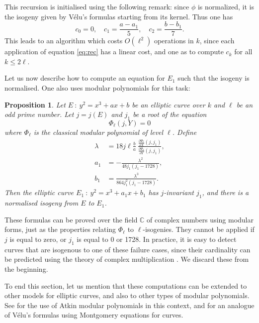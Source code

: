\documentclass{article}
\newcommand{\C}{\mathbb{C}}
\renewcommand{\v}{\vspace{5mm}}
\newtheorem{prop}[theorem]{Proposition}
\theoremstyle{definition}
\begin{document}
This recursion is initialised using the following remark: since $\phi$
is normalized,
it is the isogeny given by Vélu's formulas starting from its kernel. Thus
one has
\[
c_0 = 0,\quad c_1 = \frac{a - a_1}{5},\quad c_2 = \frac{b - b_1}{7}.
\]
This leads to an algorithm which costs $O(\ell^2)$ operations in $k$, since each
application of equation \ref{eq:rec} has a linear cost, and one as to compute
$c_k$ for all $k\leq 2\ell$.

Let us now describe how to compute an equation for $E_1$ such that the isogeny
is normalised. One also uses modular polynomials for this task:

\begin{prop}
Let $E\ :\ y^2 = x^3 + ax + b$ be an elliptic curve over $k$
 and $\ell$ be an odd prime number. Let $j = j(E)$ and $j_1$
be a root of the equation
\[
\Phi_\ell(j, Y) = 0
\]
where $\Phi_\ell$ is the classical modular polynomial of level $\ell$.
Define
\begin{equation}
\label{eq:norm}
\begin{aligned}
\lambda &= 18 j \ell \frac{b}{a}\ 
	\frac{\frac{\partial \Phi_\ell}{\partial X}(j, j_1)}
			 {\frac{\partial \Phi_\ell}{\partial Y}(j, j_1)},\\
a_1 &= -\frac{\lambda^2}{48 j_1(j_1 - 1728)},\\
b_1 &= \frac{\lambda^3}{864 j_1^2(j_1 - 1728)}.
\end{aligned}
\end{equation}
Then the elliptic curve $E_1\ :\ y^2 = x^3 + a_1x + b_1$ has $j$-invariant $j_1$,
and there is a normalised isogeny from $E$ to $E_1$.
\end{prop}

These formulas can be proved over the field $\C$ of complex numbers using
modular forms, just as the properties relating $\Phi_\ell$ to $\ell$-isogenies.
They cannot be applied if $j$ is equal to zero, or $j_1$ is equal to 0
or 1728. In practice, it is easy to detect curves that are isogenous
to one of these failure cases, since their cardinality can be predicted
using the theory of complex multiplication \cite{}.
We discard these from the beginning.

\v
To end this section, let us mention that these computations can be extended to
other models for elliptic curves, and also to other types of modular polynomials.
See \cite{} for the use of Atkin modular polynomials in this context, and \cite{}
for an analogue of Vélu's formulas using Montgomery equations for curves.
\end{document}
